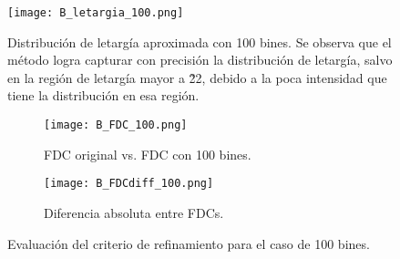 \begin{figure}[H]
    \centering
    \texttt{[image: B\_letargia\_100.png]}
    \caption{Distribución de letargía aproximada con 100 bines. Se observa que el método logra capturar con precisión la distribución de letargía, salvo en la región de letargía mayor a \~ 22, debido a la poca intensidad que tiene la distribución en esa región.}
    \label{fig:B_letargia_100}
\end{figure}

\begin{figure}[H]
    \centering
    \begin{subfigure}[b]{0.46\textwidth}
        \texttt{[image: B\_FDC\_100.png]}
        \caption{FDC original vs. FDC con 100 bines.}
        \label{fig:B_FDC_100}
    \end{subfigure}
    \hfill
    \begin{subfigure}[b]{0.46\textwidth}
        \texttt{[image: B\_FDCdiff\_100.png]}
        \caption{Diferencia absoluta entre FDCs.}
        \label{fig:B_FDCdiff_100}
    \end{subfigure}
    \caption{Evaluación del criterio de refinamiento para el caso de 100 bines.}
    \label{fig:B_FDC_100_100}
\end{figure}






